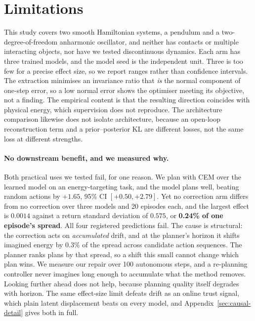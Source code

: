 \section{Limitations}
\label{sec:limits}

This study covers two smooth Hamiltonian systems, a pendulum and a two-degree-of-freedom anharmonic
oscillator, and neither has contacts or multiple interacting objects, nor have we tested
discontinuous dynamics. Each arm has three trained models, and the model seed is the independent
unit. Three is too few for a precise effect size, so we report ranges rather than confidence
intervals. The extraction minimises an invariance ratio that \emph{is} the normal component of
one-step error, so a low normal error shows the optimiser meeting its objective, not a finding. The
empirical content is that the resulting direction coincides with physical energy, which supervision
does not reproduce. The architecture comparison likewise does not isolate architecture, because an
open-loop reconstruction term and a prior--posterior KL are different losses, not the same loss at
different strengths.

\paragraph{No downstream benefit, and we measured why.}
Both practical uses we tested fail, for one reason. We plan with CEM over the learned model on an
energy-targeting task, and the model plans well, beating random actions by $+1.65$, 95\% CI
$[+0.50,+2.79]$. Yet no correction arm differs from no correction over three models and 20 episodes
each, and the largest effect is $0.0014$ against a return standard deviation of $0.575$, or
\textbf{0.24\% of one episode's spread}. All four registered predictions fail. The cause is
structural: the correction acts on \emph{accumulated} drift, and at the planner's horizon it shifts
imagined energy by $0.3\%$ of the spread across candidate action sequences. The planner ranks plans
by that spread, so a shift this small cannot change which plan wins. We measure our repair over 100
autonomous steps, and a re-planning controller never imagines long enough to accumulate what the
method removes. Looking further ahead does not help, because planning quality itself degrades with
horizon. The same effect-size limit defeats drift as an online trust signal, which plain latent
displacement beats on every model, and Appendix~\ref{sec:causal-detail} gives both in full.

